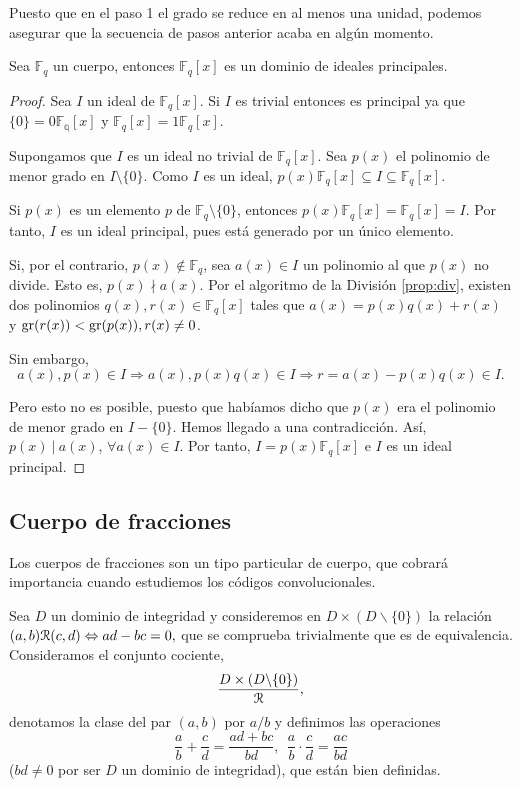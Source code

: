Puesto que en el paso 1 el grado se reduce en al menos una unidad, podemos asegurar que la secuencia de pasos anterior acaba en algún momento.

\begin{proposicion}\label{prop:dip}
    Sea $\mathbb{F}_q$ un cuerpo, entonces $\mathbb{F}_q[x]$ es un dominio de ideales principales.
\end{proposicion}

\begin{proof}
    Sea $I$ un ideal de $\mathbb{F}_q[x]$. Si $I$ es trivial entonces es principal ya que $\{0\} = 0\mathbb{F_q}[x]$ y $\mathbb{F}_q[x] = 1\mathbb{F}_q[x]$.
    
    Supongamos que $I$ es un ideal no trivial de $\mathbb{F}_q[x]$. Sea $p(x)$ el polinomio de menor grado en $I\setminus\{0\}$. Como $I$ es un ideal, $p(x)\mathbb{F}_q[x] \subseteq I \subseteq \mathbb{F}_q[x]$.
    
    Si $p(x)$ es un elemento $p$ de $\mathbb{F}_q\setminus\{0\}$, entonces $p(x)\mathbb{F}_q[x] = \mathbb{F}_q[x] = I$. Por tanto, $I$ es un ideal principal, pues está generado por un único elemento.
    
    Si, por el contrario, $p(x) \notin \mathbb{F}_q$, sea $a(x) \in I$ un polinomio al que $p(x)$ no divide. Esto es, $p(x) \nmid a(x)$. Por el algoritmo de la División \ref{prop:div}, existen dos polinomios $q(x),r(x) \in \mathbb{F}_q[x]$ tales que $a(x) = p(x)q(x) + r(x)$ y $\operatorname{gr}(r(x)) < \operatorname{gr}(p(x)), r(x) \neq 0$.

    Sin embargo, 
    $$a(x), p(x) \in I \Rightarrow a(x), p(x)q(x) \in I \Rightarrow r = a(x) - p(x)q(x) \in I.$$

    Pero esto no es posible, puesto que habíamos dicho que $p(x)$ era el polinomio de menor grado en $I - \{0\}$. Hemos llegado a una contradicción. Así, $p(x) \ | \ a(x)$, $\forall a(x) \in I$. Por tanto, $I = p(x)\mathbb{F}_q[x]$ e $I$ es un ideal principal. 

\end{proof}

\subsection{Cuerpo de fracciones}

Los cuerpos de fracciones son un tipo particular de cuerpo, que cobrará importancia cuando estudiemos los códigos convolucionales.

Sea $D$ un dominio de integridad y consideremos en $D \times (D \backslash \{0\})$ la relación $(a,b) \mathcal R (c,d) \Leftrightarrow ad - bc = 0,$ que se comprueba trivialmente que es de equivalencia. Consideramos el conjunto cociente,
$$ \frac{D \times (D \backslash \{0\})}{\mathcal R},$$ denotamos la clase del par $(a,b)$ por $a/b$ y  definimos las operaciones
$$\frac{a}{b} + \frac{c}{d} = \frac{ad + bc}{bd}, \ \ \frac{a}{b}\cdot\frac{c}{d} = \frac{ac}{bd}$$ ($bd \neq 0$ por ser $D$ un dominio de integridad), que están bien definidas.

